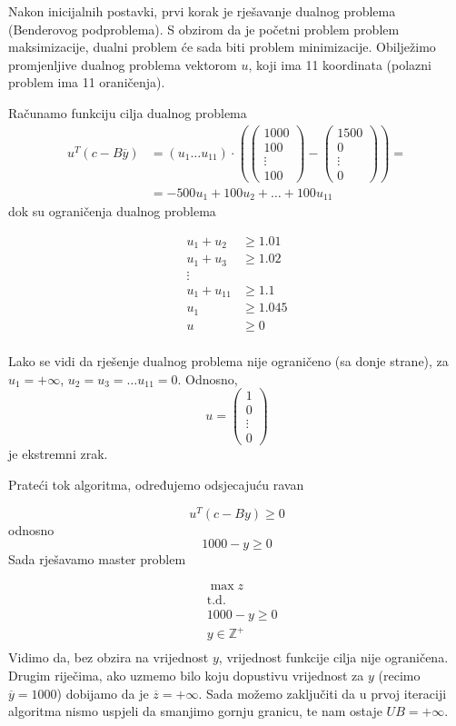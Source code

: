 \documentclass[b5paper, utf8, 11pt, colorlinks]{book}
\theoremstyle{definition}
\begin{document}
 Nakon inicijalnih postavki, prvi korak je rješavanje dualnog problema (Benderovog podproblema). S obzirom da je početni problem problem maksimizacije, dualni problem će sada biti problem minimizacije. Obilježimo promjenljive dualnog problema vektorom  $u$, koji ima 11 koordinata (polazni problem ima 11 oraničenja).
 
 Računamo funkciju cilja dualnog problema
 \begin{align*}
u^T (c-B\overline{y})&=(u_1\ldots u_{11})\cdot \left(\left(\begin{array}{c}
	1000 \\
	100 \\
	\vdots \\
	100
\end{array}\right)-\left(\begin{array}{c}
1500 \\
0 \\
\vdots \\
0
\end{array}\right)\right)=\\
& = -500u_1+100u_2+\ldots+100u_{11}
\end{align*}
dok su ograničenja dualnog problema

$$
\begin{aligned}
	u_1+u_2&\geqslant 1.01\\
	u_1+u_3&\geqslant 1.02\\
	\vdots&\\
	u_1+u_{11}&\geqslant 1.1\\
	u_1&\geqslant 1.045\\ 
	u&\geqslant 0\\
\end{aligned}
$$

Lako se vidi da rješenje dualnog problema nije ograničeno (sa donje strane), za $u_1 = +\infty$, $u_2 = u_3=\ldots u_{11}=0$.
Odnosno, 
$$u=\left(\begin{array}{c}
 1 \\
	0 \\
	\vdots \\
	0
\end{array}\right)$$ je ekstremni zrak.

Prateći tok algoritma, određujemo odsjecajuću ravan

$$u^{T}(c-By)\geqslant 0$$
odnosno
$$1000-y\geqslant 0$$
Sada rješavamo master problem


\begin{align*}
	&\max z\\
	&\mbox{t.d.} \\
	&1000-y\geqslant 0\\
	&y\in\mathbb{Z}^+\\	
\end{align*}
Vidimo da, bez obzira na vrijednost $y$, vrijednost funkcije cilja nije ograničena.
Drugim riječima, ako uzmemo bilo koju dopustivu vrijednost za $y$ (recimo $\overline{y}=1000$) dobijamo da je $\overline{z} = +\infty$. Sada možemo zaključiti da u prvoj iteraciji algoritma nismo uspjeli da smanjimo gornju granicu, te nam ostaje $UB = +\infty$.
\end{document}

